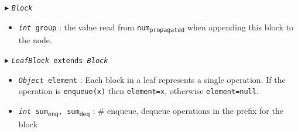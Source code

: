 \documentclass[10pt]{article}
\newcommand{\sub}[1]{\textsubscript{#1}}
\renewcommand{\tt}[1]{\texttt{#1}}
\renewcommand{\sl}[1]{\textsl{#1}}
\renewcommand{\it}[1]{\textit{#1}}
\newcommand{\cmt}[1]{\Comment{#1}}
\theoremstyle{definition}
\begin{document}
\begin{algorithm}
\begin{algorithmic}[1]
\begin{multicols}{2}
%  
%
%  

\Statex $\blacktriangleright$ \tt{\sl{Block}} 

\begin{itemize}

  \item \tt{\sl{int} group}
  \textsf{: the value read from \tt{num\sub{propagated}} when appending this block to the node.}
\end{itemize}

\pagebreak


\Statex $\blacktriangleright$ \tt{\sl{LeafBlock} extends \sl{Block}}
\begin{itemize}
  \item \tt{\sl{Object} element}
  \textsf{: Each block in a leaf represents a single operation. If the operation is \tt{enqueue(x)} then \tt{element=x}, otherwise \tt{element=null}.}
  
    \item \tt{\sl{int} sum\sub{enq}, sum\sub{deq}}
  \textsf{: \# enqueue, dequeue operations in the prefix for the block}
  
\end{itemize}




\end{multicols}
\end{algorithmic}
\end{algorithm}
\end{document}

